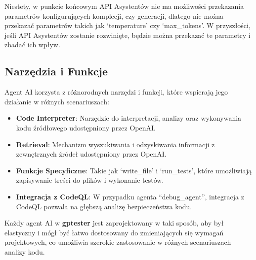 Niestety, w punkcie końcowym API Asystentów nie ma możliwości przekazania parametrów konfigurujących komplecji, czy generacji, dlatego nie można przekazać parametrów takich jak `temperature' czy `max\_tokens'. W przyszłości, jeśli API Asystentów zostanie rozwinięte, będzie można przekazać te parametry i zbadać ich wpływ.
\subsection{Narzędzia i Funkcje}

Agent AI korzysta z różnorodnych narzędzi i funkcji, które wspierają jego działanie w różnych scenariuszach:

\begin{itemize}
    \item \textbf{Code Interpreter}: Narzędzie do interpretacji, analizy oraz wykonywania kodu źródłowego udostępniony przez OpenAI.
    \item \textbf{Retrieval}: Mechanizm wyszukiwania i odzyskiwania informacji z zewnętrznych źródeł udostępniony przez OpenAI.
    \item \textbf{Funkcje Specyficzne}: Takie jak `write\_file' i `run\_tests', które umożliwiają zapisywanie treści do plików i wykonanie testów.
    \item \textbf{Integracja z CodeQL}: W przypadku agenta ``debug\_agent'', integracja z CodeQL pozwala na głębszą analizę bezpieczeństwa kodu.
\end{itemize}


Każdy agent AI w \textbf{gptester} jest zaprojektowany w taki sposób, aby był elastyczny i mógł być łatwo dostosowany do zmieniających się wymagań projektowych, co umożliwia szerokie zastosowanie w różnych scenariuszach analizy kodu.


